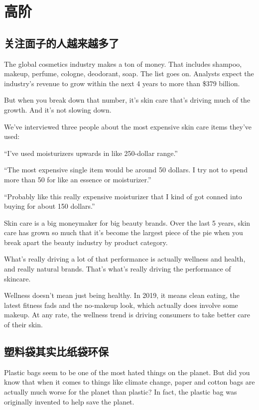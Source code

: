 \newpage
\section{高阶}
\setcounter{subsection}{40}
\subsection{关注面子的人越来越多了}
The global cosmetics industry makes a ton of money. That includes shampoo, makeup, perfume, cologne, deodorant, soap. The list goes on. Analysts expect the industry's revenue to grow within the next 4 years to more than \$379 billion.

But when you break down that number, it's skin care that's driving much of the growth. And it's not slowing down.

We've interviewed three people about the most expensive skin care items they've used:

“I've used moisturizers upwards in like 250-dollar range.”

“The most expensive single item would be around 50 dollars. I try not to spend more than 50 for like an essence or moisturizer.” 

“Probably like this really expensive moisturizer that I kind of got conned into buying for about 150 dollars.”

Skin care is a big moneymaker for big beauty brands. Over the last 5 years, skin care has grown so much that it's become the largest piece of the pie when you break apart the beauty industry by product category.

What's really driving a lot of that performance is actually wellness and health, and really natural brands. That's what's really driving the performance of skincare.

Wellness doesn't mean just being healthy. In 2019, it means clean eating, the latest fitness fads and the no-makeup look, which actually does involve some makeup. At any rate, the wellness trend is driving consumers to take better care of their skin.

\subsection{塑料袋其实比纸袋环保}
Plastic bags seem to be one of the most hated things on the planet. But did you know that when it comes to things like climate change, paper and cotton bags are actually much worse for the planet than plastic? In fact, the plastic bag was originally invented to help save the planet.


